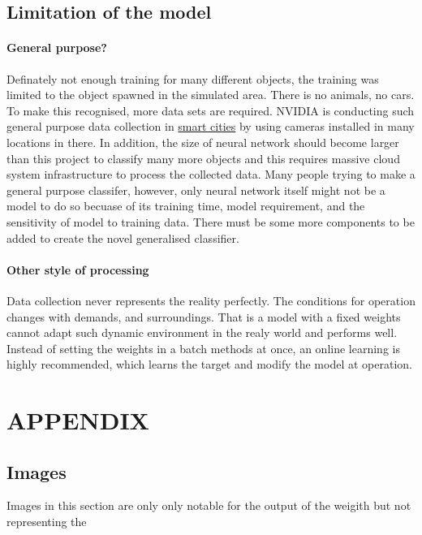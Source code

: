 \documentclass[paper=a4, fontsize=11pt]{scrartcl} %
\numberwithin{equation}{section} %
\numberwithin{figure}{section} %
\numberwithin{table}{section} %
\begin{document}
\subsection{Limitation of the model}\label{rubric50}
\paragraph{General purpose?}
Definately not enough training for many different objects, the training was limited to the object spawned in the simulated area. There is no animals, no cars. To make this recognised, more data sets are required. NVIDIA is conducting such general purpose data collection in \href{https://www.nvidia.com/en-us/deep-learning-ai/industries/ai-cities/}{smart cities} by using cameras installed in many locations in there. In addition, the size of neural network should become larger than this project to classify many more objects and this requires massive cloud system infrastructure to process the collected data.
Many people trying to make a general purpose classifer, however, only neural network itself might not be a model to do so becuase of its training time, model requirement, and the sensitivity of model to training data. There must be some more components to be added to create the novel generalised classifier.
\paragraph{Other style of processing}
Data collection never represents the reality perfectly. The conditions for operation changes with demands, and surroundings. That is a model with a fixed weights cannot adapt such dynamic environment in the realy world and performs well. Instead of setting the weights in a batch methods at once, an online learning is highly recommended, which learns the target and modify the model at operation.
\newpage
\section{APPENDIX}\label{appendix}

\subsection{Images}
Images in this section are only only notable for the output of the weigith but not representing the 
\end{document}
